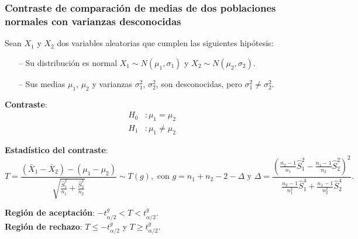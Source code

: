 \begin{frame}
\frametitle{Contraste de comparación de medias de dos poblaciones normales con varianzas desconocidas}
Sean $X_1$ y $X_2$ dos variables aleatorias que cumplen las siguientes hipótesis:
\begin{itemize}
\item[--] Su distribución es normal $X_1\sim N(\mu_1,\sigma_1)$ y $X_2\sim N(\mu_2,\sigma_2)$.
\item[--] Sus medias $\mu_1$, $\mu_2$ y varianzas $\sigma_1^2$, $\sigma_2^2$, son desconocidas, pero $\sigma^2_1\not = \sigma^2_2$.
\end{itemize}
\textbf{Contraste}:
\begin{align*}
H_0 &: \mu_1=\mu_2\\
H_1 &: \mu_1\neq \mu_2
\end{align*}

\textbf{Estadístico del contraste}:
{%
\[
T=\frac{(\bar{X}_1-\bar{X}_2)-(\mu_1-\mu_2)}{\sqrt{\frac{\hat{S}^2_1}{n_1}+\frac{\hat{S}^2_2}{n_2}}} \sim T(g), \mbox{ con } g=n_1+n_2-2-\Delta \mbox{ y } \Delta = \frac{(\frac{n_2-1}{n_1}\hat{S}_1^2-\frac{n_1-1}{n_2}\hat{S}_2^2)^2}{\frac{n_2-1}{n_1^2}\hat{S}_1^4+\frac{n_1-1}{n_2^2}\hat{S}_2^4}.
\]
}

\textbf{Región de aceptación}: $-t^{g}_{\alpha/2}< T < t^{g}_{\alpha/2}$.\\
\textbf{Región de rechazo}: $T\leq -t^{g}_{\alpha/2}$ y $T\geq t^{g}_{\alpha/2}$.
\end{frame}


